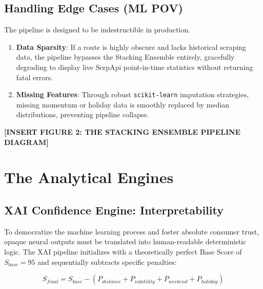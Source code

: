 \documentclass[12pt, a4paper]{article}
\begin{document}
\subsection{Handling Edge Cases (ML POV)}
The pipeline is designed to be indestructible in production. 
\begin{enumerate}
    \item \textbf{Data Sparsity}: If a route is highly obscure and lacks historical scraping data, the pipeline bypasses the Stacking Ensemble entirely, gracefully degrading to display live SerpApi point-in-time statistics without returning fatal errors.
    \item \textbf{Missing Features}: Through robust \texttt{scikit-learn} imputation strategies, missing momentum or holiday data is smoothly replaced by median distributions, preventing pipeline collapse.
\end{enumerate}

\vspace{0.5in}
\begin{center}
    \textbf{[INSERT FIGURE 2: THE STACKING ENSEMBLE PIPELINE DIAGRAM]}
\end{center}
\vspace{0.5in}

\newpage

\section{The Analytical Engines}

\subsection{XAI Confidence Engine: Interpretability}
To democratize the machine learning process and foster absolute consumer trust, opaque neural outputs must be translated into human-readable deterministic logic. The XAI pipeline initializes with a theoretically perfect Base Score of $S_{base} = 95$ and sequentially subtracts specific penalties:

\begin{equation}
    S_{final} = S_{base} - (P_{distance} + P_{volatility} + P_{weekend} + P_{holiday})
\end{equation}
\end{document}
